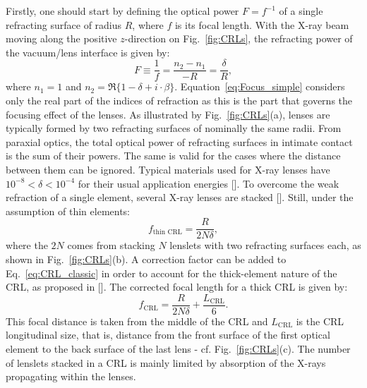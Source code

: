 \begin{refsection}
Firstly, one should start by defining the optical power $F=f^{-1}$ of a single refracting surface of radius $R$, where $f$ is its focal length. With the X-ray beam moving along the positive $z$-direction on Fig.~\ref{fig:CRLs}, the refracting power of the vacuum/lens interface is given by:
\begin{equation}\label{eq:Focus_simple}
    F\equiv\frac{1}{f}=\frac{n_2-n_1}{-R}=\frac{\delta}{R},
\end{equation}{}
where $n_1=1$ and $n_2=\Re\{{1-\delta+i\cdot\beta}\}$. Equation~\ref{eq:Focus_simple} considers only the real part of the indices of refraction as this is the part that governs the focusing effect of the lenses. As illustrated by Fig.~\ref{fig:CRLs}(a), lenses are typically formed by two refracting surfaces of nominally the same radii. From paraxial optics, the total optical power of refracting surfaces in intimate contact is the sum of their powers. The same is valid for the cases where the distance between them can be ignored. Typical materials used for X-ray lenses have $10^{-8}<\delta<10^{-4}$ for their usual application energies [\cite{Serebrennikov2016}]. To overcome the weak refraction of a single element, several X-ray lenses are stacked [\cite{Tomie1994, Snigirev1996}]. Still, under the assumption of thin elements:
\begin{equation}\label{eq:CRL_classic}
    f_{\text{thin}\text{~CRL}} = \frac{R}{2N\delta},
\end{equation}{}
where the $2N$ comes from stacking $N$ lenslets with two refracting surfaces each, as shown in Fig.~\ref{fig:CRLs}(b). A correction factor can be added to Eq.~\ref{eq:CRL_classic} in order to account for the thick-element nature of the CRL, as proposed in [\cite{Kohn2003}]. The corrected focal length for a thick CRL is given by:
\begin{equation}\label{eq:CRL}
        f_{\text{CRL}} = \frac{R}{2N\delta}+\frac{L_{\text{CRL}}}{6}.
\end{equation}{}
This focal distance is taken from the middle of the CRL and $L_{\text{CRL}}$ is the CRL longitudinal size, that is, distance from the front surface of the first optical element to the back surface of the last lens - cf. Fig.~\ref{fig:CRLs}(c). The number of lenslets stacked in a CRL is mainly limited by absorption of the X-rays propagating within the lenses.


\end{refsection}
